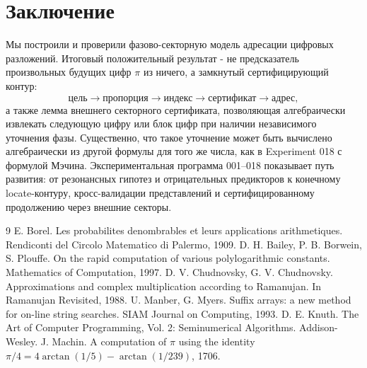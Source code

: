 \documentclass[11pt,a4paper]{article}
\begin{document}
\section{Заключение}

Мы построили и проверили фазово-секторную модель адресации цифровых разложений.  Итоговый положительный результат - не предсказатель произвольных будущих цифр $\pi$ из ничего, а замкнутый сертифицирующий контур:
\[
  \text{цель}\to\text{пропорция}\to\text{индекс}\to\text{сертификат}\to\text{адрес},
\]
а также лемма внешнего секторного сертификата, позволяющая алгебраически извлекать следующую цифру или блок цифр при наличии независимого уточнения фазы.  Существенно, что такое уточнение может быть вычислено алгебраически из другой формулы для того же числа, как в Experiment 018 с формулой Мэчина.  Экспериментальная программа 001--018 показывает путь развития: от резонансных гипотез и отрицательных предикторов к конечному locate-контуру, кросс-валидации представлений и сертифицированному продолжению через внешние секторы.

\newpage
\begin{thebibliography}{9}
 E. Borel. Les probabilites denombrables et leurs applications arithmetiques. Rendiconti del Circolo Matematico di Palermo, 1909.
 D. H. Bailey, P. B. Borwein, S. Plouffe. On the rapid computation of various polylogarithmic constants. Mathematics of Computation, 1997.
 D. V. Chudnovsky, G. V. Chudnovsky. Approximations and complex multiplication according to Ramanujan. In Ramanujan Revisited, 1988.
 U. Manber, G. Myers. Suffix arrays: a new method for on-line string searches. SIAM Journal on Computing, 1993.
 D. E. Knuth. The Art of Computer Programming, Vol. 2: Seminumerical Algorithms. Addison-Wesley.
 J. Machin. A computation of $\pi$ using the identity $\pi/4=4\arctan(1/5)-\arctan(1/239)$, 1706.
\end{thebibliography}
\end{document}
